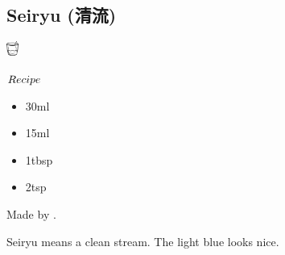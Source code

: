 \subsection{Seiryu (清流)}
\vspace{-7mm}
\hspace{38mm}
\includegraphics[width=4mm]{cocktail_glass_rock.png}
\vspace{2.5mm}
\begin{itembox}[l]{\boldmath $Recipe$}
\begin{itemize}
\setlength{\parskip}{0cm}
\setlength{\itemsep}{0cm}
\item \sake 30ml
\item \bc 15ml
\item \lj 1tbsp
\item \limj 2tsp
\end{itemize}
\vspace{-4mm}
Made by \shake.
\end{itembox}
Seiryu means a clean stream. The light blue looks nice.

